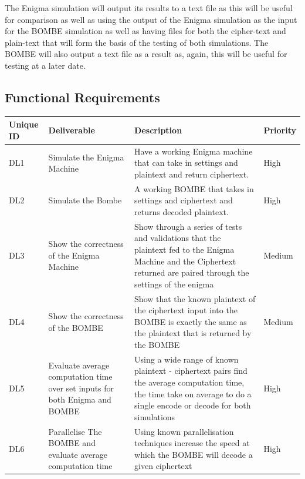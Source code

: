 \documentclass[12pt,a4paper]{article}
\begin{document}
The Enigma simulation will output its results to a text file as this will be useful for comparison as well as using the output of the Enigma simulation as the input for the BOMBE simulation as well as having files for both the cipher-text and plain-text that will form the basis of the testing of both simulations. The BOMBE will also output a text file as a result as, again, this will be useful for testing at a later date. 

\subsection{Functional Requirements}

\begin{table}[htb]
\centering
\caption{Functional Requirements}
\vspace*{6pt}
\label{units}
\begin{longtable}{ |p{3cm}|p{3cm}|p{3cm}|p{3cm}| }\hline\hline
Unique ID & Deliverable & Description & Priority \\ \hline
DL1 & Simulate the Enigma Machine & Have a working Enigma machine that can take in settings and plaintext and return ciphertext. & High \\ \hline
DL2 & Simulate the Bombe & A working BOMBE that takes in settings and ciphertext and returns decoded plaintext. & High \\ \hline
DL3 & Show the correctness of the Enigma Machine & Show through a series of tests and validations that the plaintext fed to the Enigma Machine and the Ciphertext returned are paired through the settings of the enigma & Medium \\ \hline
DL4 & Show the correctness of the BOMBE & Show that the known plaintext of the ciphertext input into the BOMBE is exactly the same as the plaintext that is returned by the BOMBE & Medium \\ \hline
DL5 & Evaluate average computation time over set inputs for both Enigma and BOMBE & Using a wide range of known plaintext - ciphertext pairs find the average computation time, the time take on average to do a single encode or decode for both simulations & High \\ \hline
DL6 & Parallelise The BOMBE and evaluate average computation time & Using known parallelisation techniques increase the speed at which the BOMBE will decode a given ciphertext & High \\ \hline
\end{longtable}
\end{table}
\end{document}
